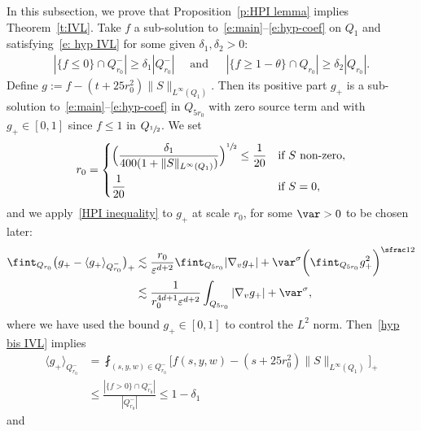 In this subsection, we prove that Proposition~\ref{p:HPI lemma}
implies Theorem~\ref{t:IVL}. Take $f$ a sub-solution
to~\eqref{e:main}--\eqref{e:hyp-coef} on $Q_1$ and
satisfying~\eqref{e: hyp IVL} for some given
$\delta_1,\delta_2>0$:\vspace*{-3pt}
\begin{align}
\label{hyp bis IVL}
|\{f\leq 0\}\cap Q_{r_0}^{-}| \geq \delta_1 |Q_{r_0}^{-}|
\quad \text{ and }\ \quad
|\{f\geq 1-\theta\} \cap Q_{r_0}| \geq \delta_2 |Q_{r_0}|.
\end{align}
Define $g:=f-(t+25r_0^2) \|S\|_{L^\infty(Q_1)}$. Then its
positive part $g_+$ is a sub-solution
to~\eqref{e:main}--\eqref{e:hyp-coef} in $Q_{5r_0}$ with zero
source term and with $g_+ \in [0,1]$ since $f\le 1$ in
$Q_{\sfrac{1}{2}}$. We set\vspace*{-3pt}
\[
r_0 = \begin{dcases}
\Bigl(\dfrac{\delta_1}{400
(1+\|S\|_{L^\infty(Q_1)})}\Bigr)^{\sfrac12} \leq
\dfrac{1}{20}&\text{if $S$ non-zero},\\
\dfrac{1}{20}&\text{if $S=0$},
\end{dcases}
\]
and we apply~\eqref{HPI inequality} to $g_+$ at scale $r_0$, for
some $\var>0$ to be chosen later:\vspace*{-3pt}
\begin{equation}\label{Poinc in proof}
\begin{aligned}
\fint_{Q_{r_0}} \bigl(g_+-\langle
g_+\rangle_{Q_{r_0}^{-}}\bigr)_{+}
& \lesssim
\frac{r_0}{\varepsilon^{d+2}} \fint_{Q_{5r_0}} |\nabla_v g_+|
+ \var^\sigma \biggl( \fint_{Q_{5r_0}} g_+^2 \biggr)^{\sfrac12}\\
& \lesssim
\frac{1}{r_0^{4d+1} \varepsilon^{d+2}} \int_{Q_{5r_0}} |\nabla_v g_+|
+ \var^\sigma,
\end{aligned}
\end{equation}
where we have used the bound $g_+ \in [0,1]$ to control the $L^2$
norm. Then~\eqref{hyp bis IVL} implies\vspace*{-3pt}
\begin{equation}
\begin{aligned}
\label{estim averag}
\langle g_+\rangle_{Q_{r_0}^{-}} &= \fint_{(s,y,w) \in
Q_{r_0}^-} \big[f(s,y,w) - (s+25r_0^2) \| S \|_{L^\infty(Q_1)}\big]_+\\
&\leq \frac{\left|{\{f>0\}\cap Q_{r_0}^-}\right|}{|Q^{-}_{r_0}|}
\leq 1-\delta_1
\end{aligned}
\end{equation}
and\vspace*{-3pt}
